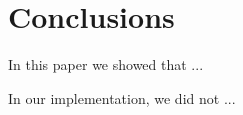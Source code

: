 \section{Conclusions}
\label{sec:conclusions}

In this paper we showed that ...

In our implementation, we did not ...